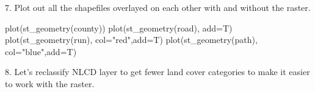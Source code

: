 \documentclass[
  letterpaper,
]{book}
\newenvironment{Shaded}{\begin{snugshade}}{\end{snugshade}}
\newcommand{\AttributeTok}[1]{\textcolor[rgb]{0.40,0.45,0.13}{#1}}
\newcommand{\FunctionTok}[1]{\textcolor[rgb]{0.28,0.35,0.67}{#1}}
\newcommand{\NormalTok}[1]{\textcolor[rgb]{0.00,0.23,0.31}{#1}}
\newcommand{\StringTok}[1]{\textcolor[rgb]{0.13,0.47,0.30}{#1}}
\begin{document}
7. Plot out all the shapefiles overlayed on each other with and without
the raster.

\begin{Shaded}
\begin{Highlighting}[]
\FunctionTok{plot}\NormalTok{(}\FunctionTok{st\_geometry}\NormalTok{(county))}
\FunctionTok{plot}\NormalTok{(}\FunctionTok{st\_geometry}\NormalTok{(road), }\AttributeTok{add=}\NormalTok{T)}
\FunctionTok{plot}\NormalTok{(}\FunctionTok{st\_geometry}\NormalTok{(run), }\AttributeTok{col=}\StringTok{"red"}\NormalTok{,}\AttributeTok{add=}\NormalTok{T)}
\FunctionTok{plot}\NormalTok{(}\FunctionTok{st\_geometry}\NormalTok{(path), }\AttributeTok{col=}\StringTok{"blue"}\NormalTok{,}\AttributeTok{add=}\NormalTok{T)}
\end{Highlighting}
\end{Shaded}

8. Let's reclassify NLCD layer to get fewer land cover categories to
make it easier to work with the raster.
\end{document}
